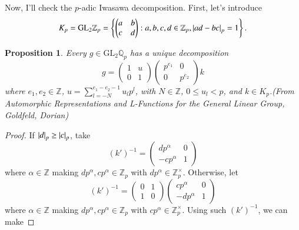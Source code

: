 \documentclass[a4paper, 12pt]{article}
\theoremstyle{Mydefinition}
\theoremstyle{Mytheorem}
\newtheorem{proposition}[statement]{Proposition}
\begin{document}
\begin{enumerate}
    Now, I'll check the $p$-adic Iwasawa decomposition. First, let's introduce
    \begin{equation}
        K_p = \mathrm{GL}_2\mathbb{Z}_p = \left\{\begin{pmatrix}
            a & b\\
            c & d
        \end{pmatrix}:a,b,c,d\in\mathbb{Z}_p,\abs{ad-bc}_p=1\right\}.
    \end{equation}
    \begin{proposition}
    Every $g\in\mathrm{GL}_2\mathbb{Q}_p$ has a unique decomposition
    \begin{equation}
        g = \begin{pmatrix}
            1 & u \\
            0 & 1
        \end{pmatrix}
        \begin{pmatrix}
            p^{e_1} & 0 \\
            0 & p^{e_2}
        \end{pmatrix}k
    \end{equation}
    where $e_1,e_2\in\mathbb{Z}$, $u=\sum_{l=-N}^{e_1-e_2-1}u_lp^l$, with $N\in\mathbb{Z}$, $0\leq u_l<p$, and $k\in K_p$.(From \textit{Automorphic Representations and L-Functions for the General Linear Group}, Goldfeld, Dorian)
    \end{proposition}
    \begin{proof}
    If $\abs{d}_p\geq \abs{c}_p$, take
    \begin{equation}
        (k')^{-1}=\begin{pmatrix}
            dp^\alpha & 0\\ -cp^\alpha & 1
        \end{pmatrix}
    \end{equation}
    where $\alpha\in\mathbb{Z}$ making $dp^\alpha,cp^\alpha\in\mathbb{Z}_p$ with $dp^{\alpha}\in\mathbb{Z}^\times_p$. Otherwise, let
    \begin{equation}
        (k')^{-1}=\begin{pmatrix}
            0 & 1\\ 1 & 0
        \end{pmatrix}\begin{pmatrix}
            cp^\alpha & 0\\ -dp^\alpha & 1
        \end{pmatrix}
    \end{equation}
    where $\alpha\in\mathbb{Z}$ making $dp^\alpha,cp^\alpha\in\mathbb{Z}_p$ with $cp^{\alpha}\in\mathbb{Z}^\times_p$. Using such $(k')^{-1}$, we can make

\end{proof}
\end{enumerate}
\end{document}
